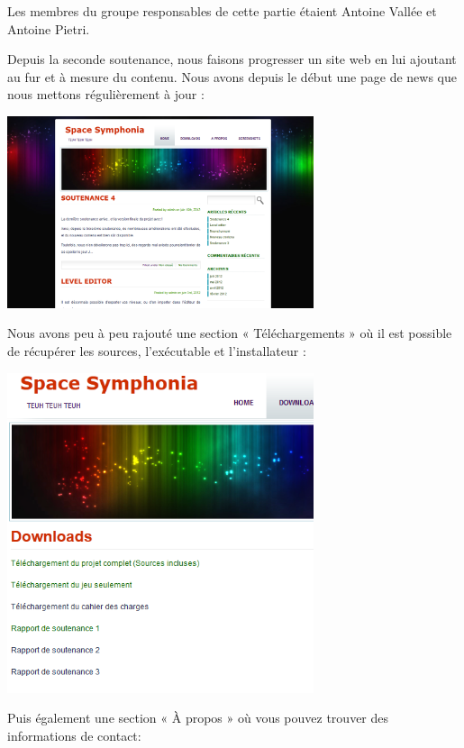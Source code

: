 \par Les membres du groupe responsables de cette partie étaient Antoine Vallée et Antoine Pietri.

\par Depuis la seconde soutenance, nous faisons progresser un site web en lui ajoutant au fur et à mesure du contenu.
Nous avons depuis le début une page de news que nous mettons régulièrement à jour :

\begin{center}
	\includegraphics[width=9cm]{images/site1.png}
\end{center}

\par Nous avons peu à peu rajouté une section « Téléchargements » où il est possible de récupérer les sources, l'exécutable et l'installateur : 

\begin{center}
	\includegraphics[width=9cm]{images/site2.png}
\end{center}

Puis également une section « À propos » où vous pouvez trouver des informations de contact:

